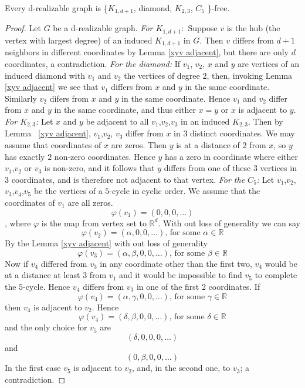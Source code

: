 \documentclass[12pt,a4paper,titlepage,openany]{report}
\begin{document}
\begin{theorem}\label{d-realizable-free}
Every d-realizable graph is \{$K_{1,d+1}$, diamond,
$K_{2,3}$, $C_5$ \}-free.
\end{theorem} 
\begin{proof} Let $G$ be a d-realizable graph.\newline
\textit{For $K_{1,d+1}:$} Suppose $v$ is the hub (the vertex with largest degree) of an induced $K_{1,d+1}$ in $G$. Then $v$ differs from $d+1$ neighbors in different coordinates by Lemma \ref{xyv adjacent}, but there are only $d$ coordinates, a contradiction.\newline
\textit{For the diamond:} If $v_1$, $v_2$, $x$ and $y$ are vertices of an induced diamond with $v_1$ and $v_2$ the vertices of degree $2$, then, invoking Lemma \ref{xyv adjacent} we see that $v_1$ differs from $x$ and $y$ in the same coordinate. Similarly $v_2$ difers from $x$ and $y$ in the same coordinate. Hence $v_1$ and $v_2$ differ from $x$ and $y$ in the same coordinate, and thus either $x=y$ or $x$ is adjacent to $y$.\newline
\textit{For $K_{2,3}$:} Let $x$ and $y$ be adjacent to all $v_1$,$v_2$,$v_3$ in an induced $K_{2,3}$. Then by Lemma ~\ref{xyv adjacent}, $v_1$,$v_2$, $v_3$ differ from $x$ in $3$ distinct coordinates. We may assume that coordinates of $x$ are zeros. Then $y$ is at a distance of $2$ from $x$, so $y$ has exactly $2$ non-zero coordinates. Hence $y$ has a zero in coordinate where either $v_1$,$v_2$ or $v_3$ is non-zero, and it follows that $y$ differs from one of these $3$ vertices in $3$ coordinates, and is therefore not adjacent to that vertex.\newline
\textit{For the $C_5$:} Let $v_1$,$v_2$,$v_3$,$v_4$,$v_5$ be the vertices of a $5$-cycle in cyclic order. We assume that the coordinates of $v_1$ are all zeros.
$$\varphi (v_1)=(0,0,0,\ldots)$$, where $\varphi$ is the map from vertex set to $\mathbb{R}^d$.\newline
With out loss of generality we can say
$$\varphi (v_2)=(\alpha,0,0,\ldots) \text{, for some } \alpha \in \mathbb{R} $$
By the Lemma \ref{xyv adjacent} with out loss of generality
$$\varphi (v_3)=(\alpha,\beta,0,0,\ldots) \text{, for some } \beta \in \mathbb{R}$$
Now if $v_4$ differed from $v_3$ in any coordinate other than the first two, $v_4$ would be at a distance at least $3$ from $v_1$ and it would be impossible to find $v_5$ to complete the $5$-cycle. Hence $v_4$ differs from $v_3$ in one of the first 2 coordinates. If 
$$\varphi (v_4)=(\alpha,\gamma,0,0,\ldots) \text{, for some } \gamma \in \mathbb{R}$$
then $v_4$ is adjacent to $v_2$. Hence
$$\varphi (v_4)=(\delta,\beta,0,0,\ldots) \text{, for some } \delta \in \mathbb{R}$$
and the only choice for $v_5$ are
$$(\delta,0,0,0,\ldots)$$
and 
$$(0,\beta,0,0,\ldots)$$
In the first case $v_5$ is adjacent to $v_2$, and, in the  second one, to $v_3$; a contradiction.
 
\end{proof}
\end{document}
